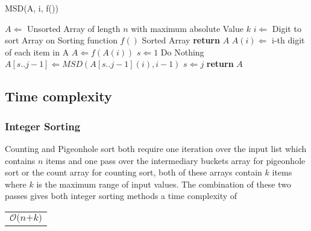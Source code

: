 \documentclass[12pt]{article}
\begin{document}
	\begin{algorithm} %
		\caption{MSD({A, i, f()})} %
		\label{alg4} %
		\begin{algorithmic}[1] %
			\REQUIRE $A \Leftarrow$ Unsorted Array of length $n$ with maximum absolute Value $k$
			\REQUIRE $i \Leftarrow$ Digit to sort Array on 
			\REQUIRE Sorting function $f()$
			\ENSURE Sorted Array
				\STATE \textbf{return} $A$
			\ENDIF
			\STATE $A(i) \Leftarrow$ i-th digit of each item in A
			\STATE $A \Leftarrow f(A(i))$ 
			\STATE $s \Leftarrow 1$ 
					\STATE Do Nothing
				\ELSE
					\STATE $A[s..j-1] \Leftarrow MSD(A[s..j-1](i), i-1)$
					\STATE $s \Leftarrow j$ 
				\ENDIF
			\ENDFOR
			\STATE \textbf{return} $A$
		\end{algorithmic}
	\end{algorithm}
	\pagebreak
	\subsection{Time complexity}
	\label{ssec:timecomplexity}
	\subsubsection{Integer Sorting}
	Counting and Pigeonhole sort both require one iteration over the input list which contains $n$ items and one pass over the intermediary buckets array for pigeonhole sort or the count array for counting sort, both of these arrays contain $k$ items where $k$ is the maximum range of input values. The combination of these two passes gives both integer sorting methods a time complexity of 
	\begin{table}[!h]
		\begin{center}
			\begin{tabular}{c}
				$\mathcal{O}\textit{(n+k)}$ 
			\end{tabular}				
			\end{center}
		\end{table}
\end{document}
